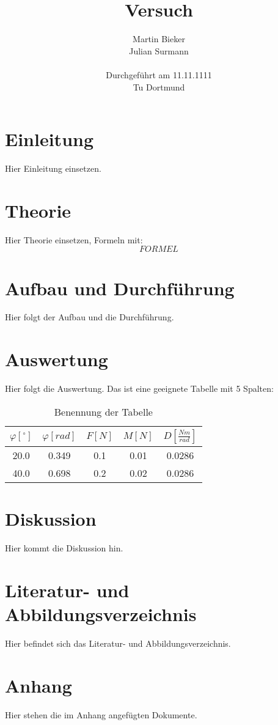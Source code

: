 \documentclass[11pt]{article}
\title{\textbf{Versuch}}
\author{Martin Bieker\\
		Julian Surmann\\
		\\
		Durchgef\"{u}hrt am 11.11.1111\\
		Tu Dortmund}
\date{}
\begin{document}
\renewcommand\tablename{Tabelle}
\renewcommand\figurename{Abbildung}
\maketitle
\thispagestyle{empty}
\newpage
\clearpage
\setcounter{page}{1}


\section{Einleitung}
Hier Einleitung einsetzen.
\section{Theorie}
Hier Theorie einsetzen, Formeln mit:
\begin{equation}
F O R M E L  
\end{equation}
\section{Aufbau und Durchf\"{u}hrung}
Hier folgt der Aufbau und die Durchführung.
\section{Auswertung}
Hier folgt die Auswertung.
Das ist eine geeignete Tabelle mit 5 Spalten:
\begin{table}[h]
\centering
\begin{tabular}{|c|c|c|c|c|}
\hline
$\varphi[^\circ]$ & $\varphi [rad]$ & $F [N]$ & $M [N]$ & $ D [\frac{Nm}{rad}]$ \\
\hline
20.0 & 0.349 & 0.1 & 0.01 & 0.0286\\
40.0 & 0.698 & 0.2 & 0.02 & 0.0286\\
\hline
\end{tabular}
\caption{Benennung der Tabelle}
\end{table}
\section{Diskussion}
Hier kommt die Diskussion hin.
\section{Literatur- und Abbildungsverzeichnis}
Hier befindet sich das Literatur- und Abbildungsverzeichnis.
\section{Anhang}
Hier stehen die im Anhang angefügten Dokumente.
\end{document}

